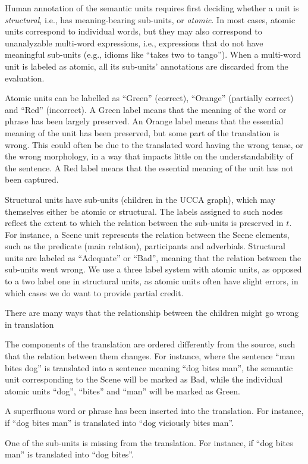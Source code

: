 \documentclass[11pt]{article}
\newcommand{\bh}[1]{}
\begin{document}
Human annotation of the semantic units requires first deciding whether
a unit is {\it structural}, i.e., has meaning-bearing sub-units,
or {\it atomic}. In most cases, atomic units
correspond to individual words, but they may also correspond to unanalyzable
multi-word expressions, i.e., expressions that do not have meaningful sub-units
(e.g., idioms like ``takes two to tango'').
When a multi-word unit is labeled as atomic, all its sub-units' annotations are discarded
from the evaluation.

Atomic units can be labelled as ``Green'' (correct), ``Orange'' (partially correct)
and ``Red'' (incorrect). 
A Green label means that the meaning of the word or phrase has been largely preserved.
An Orange label means that the essential meaning of the unit has been preserved,
but some part of the translation is wrong.
This could often be due to the translated word having the wrong tense,
or the wrong morphology, in a way that impacts little on the understandability of the sentence.
A Red label means that the essential meaning of the unit has not been captured.

Structural units have sub-units (children in the UCCA graph), which may themselves
either be atomic or structural. The labels assigned to such nodes reflect the extent to which
the relation between the sub-units is preserved in $t$.
For instance, a Scene unit represents the relation between the
Scene elements, such as the predicate (main relation), participants and adverbials.
Structural units are labeled as ``Adequate'' or ``Bad'', meaning
that the relation between the sub-units went wrong.
We use a three label system with atomic units, as
opposed to a two label one in structural units,
as atomic units often have slight errors, in which cases we do want to provide partial credit.

There are many ways that the relationship between the children might go
wrong in translation

\begin{compactitem}
\item The components of the translation are ordered differently from the source,
  such that the relation between them changes. For instance, where
  the sentence ``man bites dog'' is translated into a sentence meaning ``dog bites man'',
  the semantic unit corresponding to the Scene will be marked as Bad, while
  the individual atomic units ``dog'', ``bites'' and ``man'' will be marked as Green.
\item A superfluous word or phrase has been inserted into
  the translation. For instance, if ``dog bites man'' is translated into ``dog viciously bites man''.
\item One of the sub-units is missing from the translation.
  For instance, if ``dog bites man'' is translated into ``dog bites''. \bh{Note that in this case we also 
  get an error in the atomic unit, assuming that ``man'' is a semantic unit in the source, but for the other
  two cases there is no atomic unit error.}
\end{compactitem}
\end{document}
